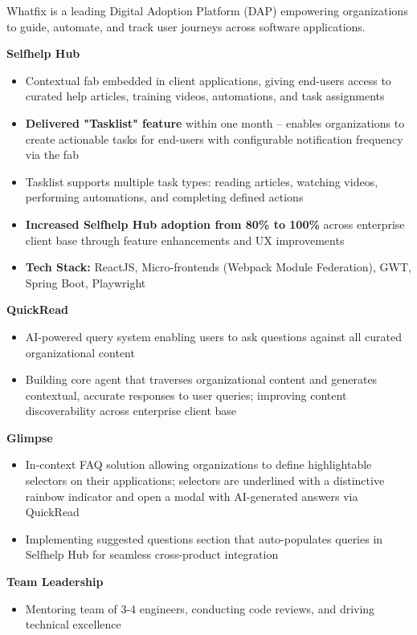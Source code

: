 \documentclass[10pt,a4paper]{article}
\begin{document}
Whatfix is a leading Digital Adoption Platform (DAP) empowering organizations to guide, automate, and track user journeys across software applications.

\textbf{Selfhelp Hub}
\begin{itemize}[leftmargin=*, nosep]
  \item Contextual fab embedded in client applications, giving end-users access to curated help articles, training videos, automations, and task assignments
  \item \textbf{Delivered "Tasklist" feature} within one month -- enables organizations to create actionable tasks for end-users with configurable notification frequency via the fab
  \item Tasklist supports multiple task types: reading articles, watching videos, performing automations, and completing defined actions
  \item \textbf{Increased Selfhelp Hub adoption from 80\% to 100\%} across enterprise client base through feature enhancements and UX improvements
  \item \textbf{Tech Stack:} ReactJS, Micro-frontends (Webpack Module Federation), GWT, Spring Boot, Playwright
\end{itemize}

\textbf{QuickRead}
\begin{itemize}[leftmargin=*, nosep]
  \item AI-powered query system enabling users to ask questions against all curated organizational content
  \item Building core agent that traverses organizational content and generates contextual, accurate responses to user queries; improving content discoverability across enterprise client base
\end{itemize}

\textbf{Glimpse}
\begin{itemize}[leftmargin=*, nosep]
  \item In-context FAQ solution allowing organizations to define highlightable selectors on their applications; selectors are underlined with a distinctive rainbow indicator and open a modal with AI-generated answers via QuickRead
  \item Implementing suggested questions section that auto-populates queries in Selfhelp Hub for seamless cross-product integration
\end{itemize}

\textbf{Team Leadership}
\begin{itemize}[leftmargin=*, nosep]
  \item Mentoring team of 3-4 engineers, conducting code reviews, and driving technical excellence
\end{itemize}
\end{document}
